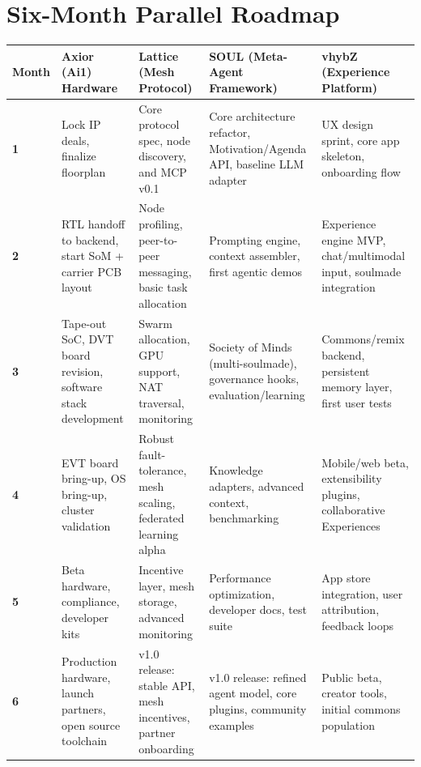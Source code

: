 \documentclass[12pt]{article}
\begin{document}
\vspace{1.5em}
\section{\color{axiorMagenta} Six-Month Parallel Roadmap}
\vspace{0.5em}

\begin{center}
\small %
\begin{tabular}{@{} l p{} p{} p{} p{} @{}} %
\toprule
\textbf{Month} & \textbf{Axior (Ai1) Hardware} & \textbf{Lattice (Mesh Protocol)} & \textbf{SOUL (Meta-Agent Framework)} & \textbf{vhybZ (Experience Platform)} \\
\midrule
\textbf{1} & Lock IP deals, finalize floorplan & Core protocol spec, node discovery, and MCP v0.1 & Core architecture refactor, Motivation/Agenda API, baseline LLM adapter & UX design sprint, core app skeleton, onboarding flow \\
\addlinespace %
\textbf{2} & RTL handoff to backend, start SoM + carrier PCB layout & Node profiling, peer-to-peer messaging, basic task allocation & Prompting engine, context assembler, first agentic demos & Experience engine MVP, chat/multimodal input, soulmade integration \\
\addlinespace
\textbf{3} & Tape-out SoC, DVT board revision, software stack development & Swarm allocation, GPU support, NAT traversal, monitoring & Society of Minds (multi-soulmade), governance hooks, evaluation/learning & Commons/remix backend, persistent memory layer, first user tests \\
\addlinespace
\textbf{4} & EVT board bring-up, OS bring-up, cluster validation & Robust fault-tolerance, mesh scaling, federated learning alpha & Knowledge adapters, advanced context, benchmarking & Mobile/web beta, extensibility plugins, collaborative Experiences \\
\addlinespace
\textbf{5} & Beta hardware, compliance, developer kits & Incentive layer, mesh storage, advanced monitoring & Performance optimization, developer docs, test suite & App store integration, user attribution, feedback loops \\
\addlinespace
\textbf{6} & Production hardware, launch partners, open source toolchain & v1.0 release: stable API, mesh incentives, partner onboarding & v1.0 release: refined agent model, core plugins, community examples & Public beta, creator tools, initial commons population \\
\bottomrule
\end{tabular}
\end{center}

\vfill %
\end{document}

